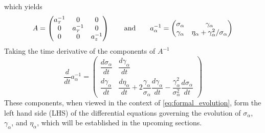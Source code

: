 which yields
\begin{equation}
  A = 
  \begin{pmatrix}
    a_{{\scriptscriptstyle T}}^{-1} & 0 & 0 \\
    0 & a_{{\scriptscriptstyle T}}^{-1} & 0 \\
    0 & 0 & a_{z}^{-1}
  \end{pmatrix}
  \qquad \text{and} \qquad
  a^{-1}_{\alpha} = 
  \begin{pmatrix}
    \sigma_{\alpha} & \gamma_{\alpha} \\
    \gamma_{\alpha} & \eta_{\alpha} + \gamma_{\alpha}^2/\sigma_{\alpha}
  \end{pmatrix}
\end{equation}
Taking the time derivative of the components of $A^{-1}$
\begin{equation} \label{eq:dainvdt}
  \frac{d}{dt} a^{-1}_{\alpha} = 
  \begin{pmatrix}
    \dfrac{d\sigma_{\alpha}}{dt} & \dfrac{d\gamma_{\alpha}}{dt} \\
    \dfrac{d\gamma_{\alpha}}{dt} & \dfrac{d\eta_{\alpha}}{dt} + 2\dfrac{\gamma_{\alpha}}{\sigma_{\alpha}}\dfrac{d\gamma_{\alpha}}{dt}- \dfrac{\gamma^{2}_{\alpha}}{\sigma^{2}_{\alpha}}\dfrac{d\sigma_{\alpha}}{dt}
  \end{pmatrix}
\end{equation}
These components, when viewed in the context of \ref{eq:formal_evolution}, form the left hand side (LHS) of the differential equations governing the evolution of $\sigma_{\alpha}$, $\gamma_{\alpha}$, and $\eta_{\alpha}$, which will be established in the upcoming sections.

